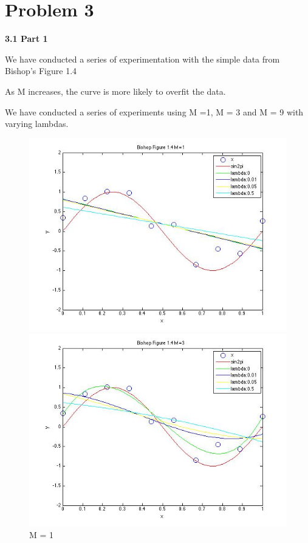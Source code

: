 \section{Problem 3}

{\bfseries 3.1 Part 1}

We have conducted a series of experimentation with the simple data from Bishop's Figure 1.4

As M increases, the curve is more likely to overfit the data. 

We have conducted a series of experiments using M =1, M = 3 and M = 9 with varying lambdas. 


\begin{figure}[!htb]
  \includegraphics[width=\linewidth]{figures/p3_bishop_m=1}
  \caption{M = 1}\label{fig:figures/p3_bishop_m=1}
\endminipage\hfill
{}
  \includegraphics[width=\linewidth]{figures/p3_bishop_m=3}

\end{figure}

